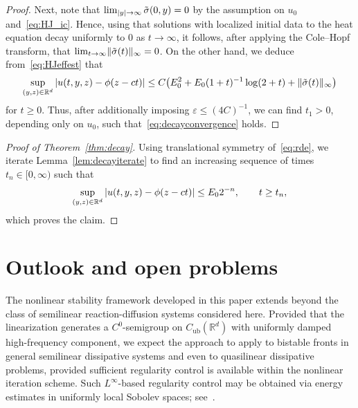 \documentclass[12pt,oneside,a4paper,reqno]{amsart}
\numberwithin{equation}{section}
\theoremstyle{definition}
\theoremstyle{remark}
\newcommand{\bbR}{{\mathbb R}}
\newcommand{\eps}{\varepsilon}
\newcommand{\Cub}{{C_{\mathrm{ub}}}}
\DeclarePairedDelimiter{\abs}{\lvert}{\rvert}
\DeclarePairedDelimiter{\norm}{\lVert}{\rVert}
\begin{document}
\begin{proof}
    Next, note that $\lim_{\abs{y} \to \infty}\tilde{\sigma}(0,y) = 0$ by the assumption on $u_0$ and~\eqref{eq:HJ_ic}. Hence, using that solutions with localized initial data to the heat equation decay uniformly to $0$ as $t \to \infty$, it follows, after applying the Cole--Hopf transform, that $\lim_{t \to \infty} \norm{\tilde{\sigma}(t)}_{\infty} = 0$.
    On the other hand, we deduce from~\eqref{eq:HJeffest} that
    \begin{equation*}
        \sup_{(y,z) \in \bbR^d} \, \abs{u(t,y,z) - \phi(z - ct)} \leq C\big( E_0^2 + E_0 (1+t)^{-1}\log(2+t) + \norm{\tilde{\sigma}(t)}_{\infty}\big)
    \end{equation*}
    for $t \geq 0$. 
    Thus, after additionally imposing $\eps \leq (4C)^{-1}$, we can find $t_1 > 0$, depending only on $u_0$, such that~\eqref{eq:decayconvergence} holds.
\end{proof}

\begin{proof}[Proof of Theorem~\ref{thm:decay}]
Using translational symmetry of~\eqref{eq:rde}, we iterate Lemma~\ref{lem:decayiterate} to find an increasing sequence of times $t_n \in [0,\infty)$ such that
\begin{equation*}
    \sup_{(y,z) \in \bbR^d} \, \abs{u(t,y,z) - \phi(z - ct)} \leq E_0 2^{-n}, \qquad t \geq t_n,
\end{equation*}
which proves the claim.
\end{proof}

\section{Outlook and open problems}
The nonlinear stability framework developed in this paper extends beyond the class of semilinear reaction-diffusion systems considered here. Provided that the linearization generates a $C^0$-semigroup on $\Cub(\bbR^d)$ with uniformly damped high-frequency component, we expect the approach to apply to bistable fronts in general semilinear dissipative systems and even to quasilinear dissipative problems, provided sufficient regularity control is available within the nonlinear iteration scheme. Such $L^\infty$-based regularity control may be obtained via energy estimates in uniformly local Sobolev spaces; see~\cite{Alexopoulos_nonlinear_2026}.
 
\end{document}
